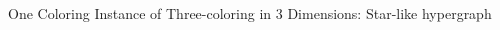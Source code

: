 \documentclass{beamer}
\begin{document}
\begin{frame}{One Coloring Instance of Three-coloring in 3 Dimensions: Star-like hypergraph}
    \begin{columns}[c] %
        \begin{column}{0.45\textwidth}
\end{column}
\end{columns}
\end{frame}
\end{document}
